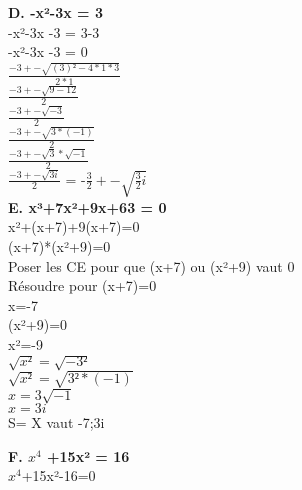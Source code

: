 \newpage
\textbf{D. -x²-3x = 3} \\

-x²-3x -3 = 3-3 \\
-x²-3x -3 = 0 \\

$\frac{-3+-\sqrt{(3)²-4*1*3}}{2*1}$ \\

$\frac{-3+-\sqrt{9-12}}{2}$ \\

$\frac{-3+-\sqrt{-3}}{2}$ \\

$\frac{-3+-\sqrt{3 * (-1)}}{2}$ \\

$\frac{-3+-\sqrt{3} * \sqrt{-1}}{2}$ \\

$\frac{-3+-\sqrt{3i}}{2}$ = -$\frac{3}{2} +- \sqrt{\frac{3}{2}i}$ \\

\vspace{10mm} %
\textbf{E. x³+7x²+9x+63 = 0} \\

x²+(x+7)+9(x+7)=0 \\

(x+7)*(x²+9)=0 \\

Poser les CE pour que (x+7) ou (x²+9) vaut 0 \\

Résoudre pour (x+7)=0 \\

x=-7 \\

(x²+9)=0 \\

x²=-9 \\

$\sqrt{x²} =\sqrt{-3²}$ \\

$\sqrt{x²}=\sqrt{3²*(-1)}$ \\

$x=3\sqrt{-1}$ \\

$x=3i$ \\

S= X vaut -7;3i \\

\newpage

\textbf{F. $x^{4}$ +15x² = 16} \\

$x^{4}$+15x²-16=0 \\

